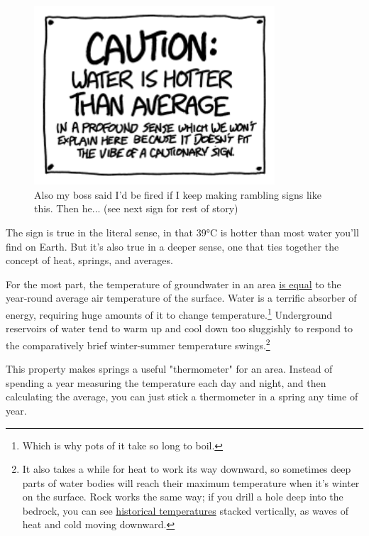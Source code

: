 {\begin{figure}[!htbp]
\centering
\includegraphics[scale=0.5, max width=0.8\textwidth]{imgs/a/132/profound.png}
\caption{Also my boss said I'd be fired if I keep making rambling signs like this. Then he... (see next sign for rest of story)}
\end{figure}

{The sign is true in the literal sense, in that 39°C is hotter than most water you'll find on Earth. But it's also true in a deeper sense, one that ties together the concept of heat, springs, and averages.}

{For the most part, the temperature of groundwater in an area \href{http://www.ngwa.org/Fundamentals/studying/Pages/Groundwater-temperature\%27s-measurement-and-significance.aspx}{is equal} to the year-round average air temperature of the surface. Water is a terrific absorber of energy, requiring huge amounts of it to change temperature.{\footnote{Which is why pots of it take so long to boil.} } Underground reservoirs of water tend to warm up and cool down too sluggishly to respond to the comparatively brief winter-summer temperature swings.{\footnote{It also takes a while for heat to work its way downward, so sometimes deep parts of water bodies will reach their maximum temperature when it's winter on the surface. Rock works the same way; if you drill a hole deep into the bedrock, you can see \href{http://deepblue.lib.umich.edu/bitstream/handle/2027.42/30810/0000468.pdf?sequence=1}{historical temperatures} stacked vertically, as waves of heat and cold moving downward.} } }

{This property makes springs a useful "thermometer" for an area. Instead of spending a year measuring the temperature each day and night, and then calculating the average, you can just stick a thermometer in a spring any time of year.}

}
